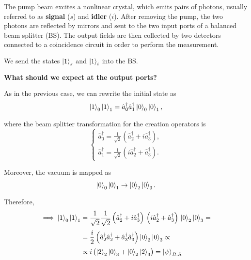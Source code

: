 The pump beam excites a nonlinear crystal, which emits pairs of photons, usually referred to as \textbf{signal} ($s$) and \textbf{idler} ($i$). After removing the pump, the two photons are reflected by mirrors and sent to the two input ports of a balanced beam splitter (BS). The output fields are then collected by two detectors connected to a coincidence circuit in order to perform the measurement.

We send the states $\ket{1}_s$ and $\ket{1}_i$ into the BS. 

\textbf{What should we expect at the output ports?}

As in the previous case, we can rewrite the initial state as
\begin{equation}\label{eqn:16-twin-single-photon-state}
\ket{1}_0\ket{1}_1 = \hat a_0^\dagger \hat a_1^\dagger \ket{0}_0\ket{0}_1,
\end{equation}

where the beam splitter transformation for the creation operators is
\begin{equation}\label{eqn:16-b-s-creation-operators-2}
\begin{cases}
\hat a_0^\dagger = \frac{1}{\sqrt{2}}\left(\hat a_2^\dagger + i\hat a_3^\dagger\right),\\[1ex]
\hat a_1^\dagger = \frac{1}{\sqrt{2}}\left(i\hat a_2^\dagger + \hat a_3^\dagger\right).
\end{cases}
\end{equation}

Moreover, the vacuum is mapped as
\begin{equation}\label{eqn:16-vacuum-state-mapping}
\ket{0}_0\ket{0}_1 \to \ket{0}_2\ket{0}_3.
\end{equation}

Therefore,
\begin{equation}\label{eqn:16-single-photon-state-3}
\begin{split}
    \implies \ket{1}_0\ket{1}_1 &= 
    \frac{1}{\sqrt{2}}\frac{1}{\sqrt{2}}
    \left(\hat{a}_2^\dagger +i\hat{a}_3^\dagger \right)\, 
    \left(i\hat{a}_2^\dagger +\hat{a}_3^\dagger \right)\, 
    \ket{0}_2\ket{0}_3 = \\[0.5ex]
    &=\frac{i}{2}
    \left(\hat{a}_2^\dagger \hat{a}_2^\dagger +\hat{a}_3^\dagger \hat{a}_3^\dagger \right) \ket{0}_2\ket{0}_3 \propto \\[0.5ex]
    &\propto i\,
    \bigl(\ket{2}_2\ket{0}_3+\ket{0}_2\ket{2}_3\bigr) 
    = \ket{\psi}_{B.S.}
\end{split}
\end{equation}

